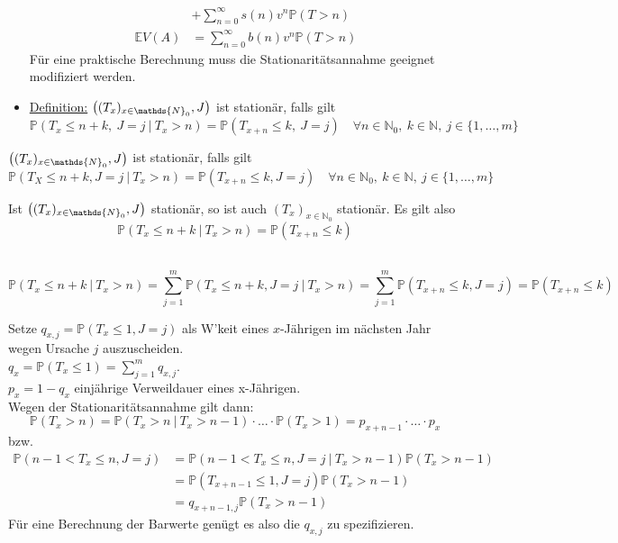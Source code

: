 \begin{itemize}
\begin{equation*}
\begin{aligned}
		&+ \sum_{n=0}^{\infty}s(n)v^n\mathds{P}(T>n)\\
		\mathds{E}V(A) &= \sum_{n=0}^{\infty}b(n)v^n\mathds{P}(T>n)
	\end{aligned}
	\end{equation*}
	Für eine praktische Berechnung muss die Stationaritätsannahme geeignet modifiziert werden.\\
	\item \uline{Definition:} $\enbrace{(T_x)_{x\in \mathds{N}_0},J}$ ist stationär, falls gilt
	\[\mathds{P}(T_x\le n+k,~J=j~|~T_x>n)=\mathds{P}(T_{x+n}\le k,~ J=j)\quad \forall n\in \mathds{N}_0,~k\in\mathds{N},~j\in \{1,\dots,m\} \]
\end{itemize}

$\enbrace{(T_x)_{x\in \mathds{N}_0},J}$ ist stationär, falls gilt \[ \mathds{P}(T_X\le n+k,J=j~|~T_x>n)=\mathds{P}(T_{x+n}\le k,J=j)\quad \forall n\in \mathds{N}_0,~k\in \mathds{N},~j\in \{1,\dots,m\} \]

Ist $\enbrace{(T_x)_{x\in \mathds{N}_0},J}$ stationär, so ist auch $(T_x)_{x\in \mathds{N}_0}$ stationär. Es gilt also \[ \mathds{P}(T_x\le n+k~|~T_x>n)=\mathds{P}(T_{x+n}\le k) \]

\\
\[ \mathds{P}(T_x\le n+k~|~T_x>n)= \sum_{j=1}^{m}\mathds{P}(T_x\le n+k,J=j~|~T_x>n)= \sum_{j=1}^{m}\mathds{P}(T_{x+n}\le k,J=j)= \mathds{P}(T_{x+n}\le k) \]

Setze $q_{x,j}=\mathds{P}(T_x\le 1,J=j)$ als W'keit eines $x$-Jährigen im nächsten Jahr wegen Ursache $j$ auszuscheiden.\\
$q_x=\mathds{P}(T_x\le 1)=\sum\limits_{j=1}^{m}q_{x,j}$.\\
$p_x=1-q_x$ einjährige Verweildauer eines x-Jährigen.\\
Wegen der Stationaritätsannahme gilt dann: \[ \mathds{P}(T_x>n)=\mathds{P}(T_x>n~|~T_x>n-1)\cdot\dots \cdot \mathds{P}(T_x>1)= p_{x+n-1}\cdot \dots\cdot p_x \]
bzw.
\begin{equation*}
\begin{aligned}
	\mathds{P}(n-1<T_x\le n,J=j) &= \mathds{P}(n-1<T_x\le n,J=j~|~T_x>n-1)\mathds{P}(T_x>n-1)\\
	&= \mathds{P}(T_{x+n-1}\le 1,J=j)\mathds{P}(T_x>n-1)\\
	&= q_{x+n-1,j}\mathds{P}(T_x>n-1)
\end{aligned}
\end{equation*}
Für eine Berechnung der Barwerte genügt es also die $q_{x,j}$ zu spezifizieren.\\

